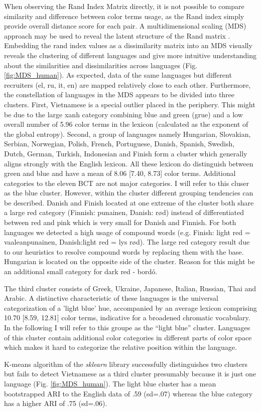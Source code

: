 When observing the Rand Index Matrix directly, it is not possible to compare similarity and difference between color terms usage, as the Rand index simply provide overall distance score for each pair.
A multidimensional scaling (MDS) approach may be used to reveal the latent structure of the Rand matrix \parencite{shepard1980multidimensional}. Embedding the rand index values as a dissimilarity matrix into an MDS visually reveals the clustering of different languages and give more intuitive understanding about the similarities and dissimilarities across languages (Fig. \ref{fig:MDS_human}).
As expected, data of the same languages but different recruiters (el, ru, it, en) are mapped relatively close to each other. 
Furthermore, the constellation of languages in the MDS appears to be divided into three clusters.
First, Vietnamese is a special outlier placed in the periphery. This might be due to the large xanh category combining blue and green (grue) and a low overall number of 5.96 color terms in the lexicon (calculated as the exponent of the global entropy).
Second, a group of languages namely Hungarian, Slovakian, Serbian, Norwegian, Polish, French, Portuguese, Danish, Spanish, Swedish, Dutch, German, Turkish, Indonesian and Finish form a cluster which generally aligns strongly with the English lexicon. 
All these lexicon do distinguish between green and blue and have a mean of 8.06 [7.40, 8.73] color terms.
Additional categories to the eleven BCT are not major categories.
I will refer to this cluser as the blue cluster.
However, within the cluster different grouping tendencies can be described. 
Danish and Finish located at one extreme of the cluster both share a large red category (Finnish: punainen, Danish: rød) instead of differentiated between red and pink which is very small for Danish and Finnish. For both languages we detected a high usage of compound words (e.g. Finish: light red = vaaleanpunainen, Danish:light red = lys rød). The large red category result due to our heuristics to resolve compound words by replacing them with the base. 
Hungarian is located on the opposite side of the cluster. Reason for this might be an additional small category for dark red - bordó.


The third cluster consists of Greek, Ukraine, Japanese, Italian, Russian, Thai and Arabic.
A distinctive characteristic of these languages is the universal categorization of a 'light blue' hue, accompanied by an average lexicon comprising 10.70 [8.59, 12.81] color terms, indicative for a broadened chromatic vocabulary.
In the following I will refer to this groupe as the “light blue” cluster.
Languages of this cluster contain additional color categories in different parts of color space which makes it hard to categorize the relative position within the language.

K-means algorithm of the \textit{sklearn} library successfully distinguishes two clusters but fails to detect Vietnamese as a third cluster presumably because it is just one language (Fig. \ref{fig:MDS_human}).
The light blue cluster has a mean bootstrapped ARI to the English data of .59 (sd=.07) whereas the blue category has a higher ARI of .75 (sd=.06).



